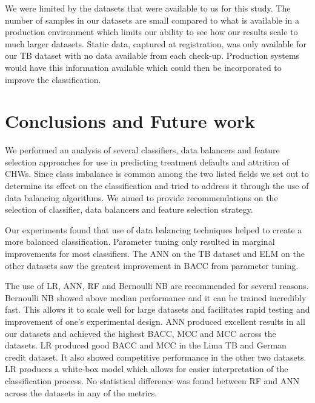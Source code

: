\documentclass{sig-alternate-05-2015}
\begin{document}
	We were limited by the datasets that were available to us for this study. The number of samples in our datasets are small compared to what is available in a production environment which limits our ability to see how our results scale to much larger datasets. Static data, captured at registration, was only available for our TB dataset with no data available from each check-up. Production systems would have this information available which could then be incorporated to improve the classification.
	
	\section{Conclusions and Future work} 
	We performed an analysis of several classifiers, data balancers and feature selection approaches for use in predicting treatment defaults and attrition of CHWs. Since class imbalance is common among the two listed fields we set out to determine its effect on the classification and tried to address it through the use of data balancing algorithms. We aimed to provide recommendations on the selection of classifier, data balancers and feature selection strategy.
	
	Our experiments found that use of data balancing techniques helped to create a more balanced classification. Parameter tuning only resulted in marginal improvements for most classifiers. The ANN on the TB dataset and ELM on the other datasets saw the greatest improvement in BACC from parameter tuning.
	
	The use of LR, ANN, RF and Bernoulli NB are recommended for several reasons. Bernoulli NB showed above median performance and it can be trained incredibly fast. This allows it to scale well for large datasets and facilitates rapid testing and improvement of one's experimental design. ANN produced excellent results in all our datasets and achieved the highest BACC, MCC and MCC across the datasets. LR produced good BACC and MCC in the Lima TB and German credit dataset. It also showed competitive performance in the other two datasets. LR produces a white-box model which allows for easier interpretation of the classification process. No statistical difference was found between RF and ANN across the datasets in any of the metrics.
	
\end{document}
